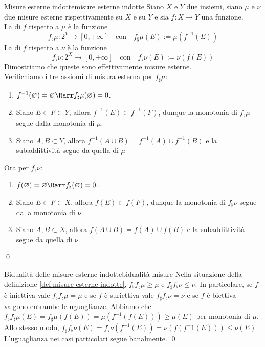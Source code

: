 \documentclass[openany]{book}
\begin{document}
\begin{definition}{Misure esterne indotte}{misure esterne indotte}
    Siano $X$ e $Y$ due insiemi, siano $\mu$ e $\nu$ due misure esterne rispettivamente su $X$ e su $Y$ e sia $f:X\to Y$ una funzione.\\
    La  di $f$ rispetto a $\mu$ è la funzione
    \[f_\sharp\mu : 2^Y \to [0,+\infty] \quad \text{con} \quad f_\sharp\mu(E):= \mu(f^{-1}(E)) \]
    La  di $f$ rispetto a $\nu$ è la funzione
    \[f_\flat\nu : 2^X \to [0,+\infty] \quad \text{con} \quad f_\flat\nu(E) := \nu(f(E))\]
    \proof 
    Dimostriamo che queste sono effettivamente misure esterne.\\
    Verifichiamo i tre assiomi di misura esterna per $f_\sharp\mu$:\begin{enumerate}
        \item $f^{-1}(\varnothing) = \varnothing \Rarr f_\sharp\mu(\varnothing) = 0$.
        \item Siano $E \subset F \subset Y$, allora $f^{-1}(E)\subset f^{-1}(F)$, dunque la monotonia di $f_\sharp\mu$ segue dalla monotonia di $\mu$.
        \item Siano $A,B \subset Y$, allora $f^{-1}(A\cup B)= f^{-1}(A) \cup f^{-1}(B)$ e la subaddittività segue da quella di $\mu$
    \end{enumerate}
    Ora per $f_\flat\nu$:\begin{enumerate}
        \item $f(\varnothing) = \varnothing \Rarr f_\flat(\varnothing) = 0$.
        \item Siano $E \subset F \subset X$, allora $f(E)\subset f(F)$, dunque la monotonia di $f_\flat\nu$ segue dalla monotonia di $\nu$.
        \item Siano $A,B \subset X$, allora $f(A \cup B) = f(A)\cup f(B)$ e la subaddittività segue da quella di $\nu$.
    \end{enumerate}
    \qed
\end{definition}

\begin{proposition}{Bidualità delle misure esterne indotte}{bidualità misure}
    Nella situazione della definizione \ref{def:misure esterne indotte}, $f_\flat f_\sharp\mu \ge \mu$ e $f_\sharp f_\flat\nu \le \nu$. In particolare, se $f$ è iniettiva vale $f_\flat f_\sharp\mu = \mu$ e se $f$ è suriettiva vale $f_\sharp f_\flat\nu = \nu$ e se $f$ è biettiva valgono entrambe le uguaglianze.
    \proof
    Abbiamo che $f_\flat f_\sharp\mu(E) = f_\sharp\mu(f(E)) = \mu(f^{-1}(f(E)))\ge \mu(E)$ per monotonia di $\mu$.\\
    Allo stesso modo, $f_\sharp f_\flat\nu(E) = f_\flat\nu(f^{-1}(E)) = \nu(f(f^-1(E))) \le \nu(E)$\\
    L'uguaglianza nei casi particolari segue banalmente.
    \qed
\end{proposition}
\end{document}
